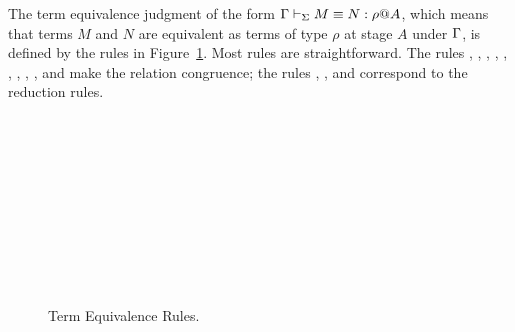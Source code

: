 The term equivalence judgment of the form $\Gamma \vdash_\Sigma M \equiv N : \rho @ A$,
which means that terms $M$ and $N$ are equivalent as terms of type
$\rho$ at stage $A$ under $\Gamma$, is defined by the rules in
Figure~\ref{fig:term-equivalence-rules}.  Most rules are
straightforward.  The rules \QAbs, \QApp, \QTB, \QTBL, \QGen, \QIns,
\QCsp, \QRefl, \QSym, and \QTrans{} make the relation congruence; the
rules \QBeta, \QTBLTB, and \QLambda{} correspond to the reduction rules.

\begin{figure}
	\begin{center}
		 \\[2mm]
		 \\[2mm]
		 \andalso
		 \\[2mm]
		 \\[2mm]
		 \andalso
		 \\[2mm]
		 \andalso
		 \\[2mm]
		 \\[2mm]
		 \\[2mm]
		 \\[2mm]
		 \hfil
		\caption{Term Equivalence Rules.}
		\label{fig:term-equivalence-rules}
	\end{center}
\end{figure}


